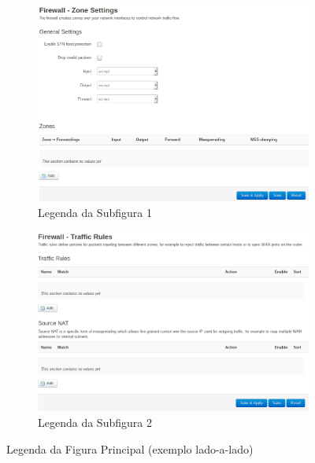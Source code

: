 \begin{figure}[!htb]
    \centering
    \begin{subfigure}[b]{0.45\textwidth}
        \centering
        \includegraphics[width=\textwidth]{images/firewall_zone}
        \caption{Legenda da Subfigura 1}
        \label{fig:id_subfig1}
    \end{subfigure}
    \hfill
    \begin{subfigure}[b]{0.45\textwidth}
        \centering
        \includegraphics[width=\textwidth]{images/firewall_traffic.png}
        \caption{Legenda da Subfigura 2}
        \label{fig:id_subfig2}
    \end{subfigure}
    \caption{Legenda da Figura Principal (exemplo lado-a-lado)}
    \label{fig:id_figura_principal}
\end{figure}

